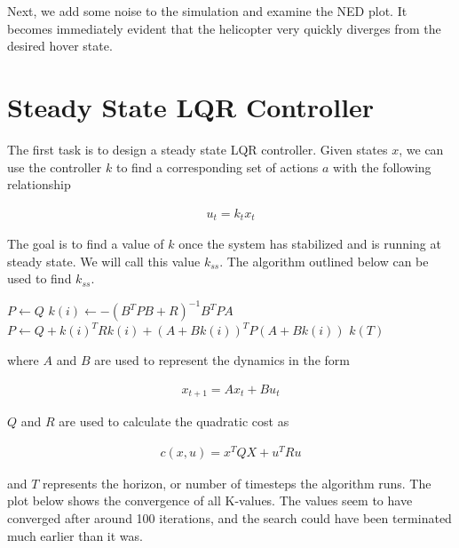 \documentclass{article}
\begin{document}
Next, we add some noise to the simulation and examine the NED plot. It becomes immediately evident that the helicopter very quickly diverges from the desired hover state.


\section{Steady State LQR Controller}

 The first task is to design a steady state LQR controller. Given states $x$, we can use the controller $k$ to find a corresponding set of actions $a$ with the following relationship

\begin{align}
    u_t = k_t x_t
\end{align}

The goal is to find a value of $k$ once the system has stabilized and is running at steady state. We will call this value $k_{ss}$. The algorithm outlined below can be used to find $k_{ss}$.

\begin{algorithm}
\begin{algorithmic}[1]
	\State $P \gets Q$
		\State $k(i) \gets -(B^T P B + R)^{-1} B^T P A$
		\State $P \gets Q + k(i)^T R k(i) + (A + B k(i))^T P (A + B k(i))$
	\EndFor
	\State \Return $k(T)$
\EndFunction
\end{algorithmic}
\end{algorithm}

where $A$ and $B$ are used to represent the dynamics in the form

\begin{align}
    x_{t+1} = Ax_t + Bu_t
\end{align}

$Q$ and $R$ are used to calculate the quadratic cost as

\begin{align}
    c(x, u) = x^TQX + u^TRu
\end{align}

and $T$ represents the horizon, or number of timesteps the algorithm runs. The plot below shows the convergence of all K-values. The values seem to have converged after around 100 iterations, and the search could have been terminated much earlier than it was. 
\end{document}
